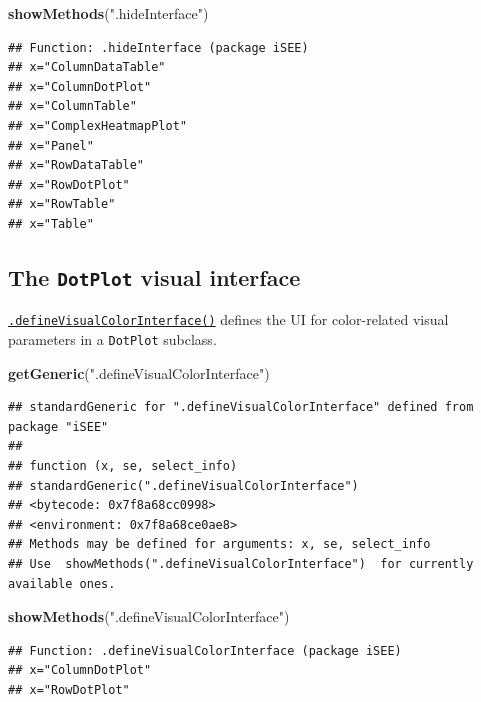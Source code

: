 \documentclass[
]{book}
\newenvironment{Shaded}{\begin{snugshade}}{\end{snugshade}}
\newcommand{\KeywordTok}[1]{\textcolor[rgb]{0.13,0.29,0.53}{\textbf{#1}}}
\newcommand{\NormalTok}[1]{#1}
\newcommand{\StringTok}[1]{\textcolor[rgb]{0.31,0.60,0.02}{#1}}
\begin{document}
\begin{Shaded}
\begin{Highlighting}[]
\KeywordTok{showMethods}\NormalTok{(}\StringTok{".hideInterface"}\NormalTok{)}
\end{Highlighting}
\end{Shaded}

\begin{verbatim}
## Function: .hideInterface (package iSEE)
## x="ColumnDataTable"
## x="ColumnDotPlot"
## x="ColumnTable"
## x="ComplexHeatmapPlot"
## x="Panel"
## x="RowDataTable"
## x="RowDotPlot"
## x="RowTable"
## x="Table"
\end{verbatim}

\hypertarget{the-dotplot-visual-interface}{%
\subsection{\texorpdfstring{The \texttt{DotPlot} visual interface}{The DotPlot visual interface}}\label{the-dotplot-visual-interface}}

\href{https://isee.github.io/iSEE/reference/visual-parameters-generics.html}{\texttt{.defineVisualColorInterface()}} defines the UI for color-related visual parameters in a \texttt{DotPlot} subclass.

\begin{Shaded}
\begin{Highlighting}[]
\KeywordTok{getGeneric}\NormalTok{(}\StringTok{".defineVisualColorInterface"}\NormalTok{)}
\end{Highlighting}
\end{Shaded}

\begin{verbatim}
## standardGeneric for ".defineVisualColorInterface" defined from package "iSEE"
## 
## function (x, se, select_info) 
## standardGeneric(".defineVisualColorInterface")
## <bytecode: 0x7f8a68cc0998>
## <environment: 0x7f8a68ce0ae8>
## Methods may be defined for arguments: x, se, select_info
## Use  showMethods(".defineVisualColorInterface")  for currently available ones.
\end{verbatim}

\begin{Shaded}
\begin{Highlighting}[]
\KeywordTok{showMethods}\NormalTok{(}\StringTok{".defineVisualColorInterface"}\NormalTok{)}
\end{Highlighting}
\end{Shaded}

\begin{verbatim}
## Function: .defineVisualColorInterface (package iSEE)
## x="ColumnDotPlot"
## x="RowDotPlot"
\end{verbatim}
\end{document}
